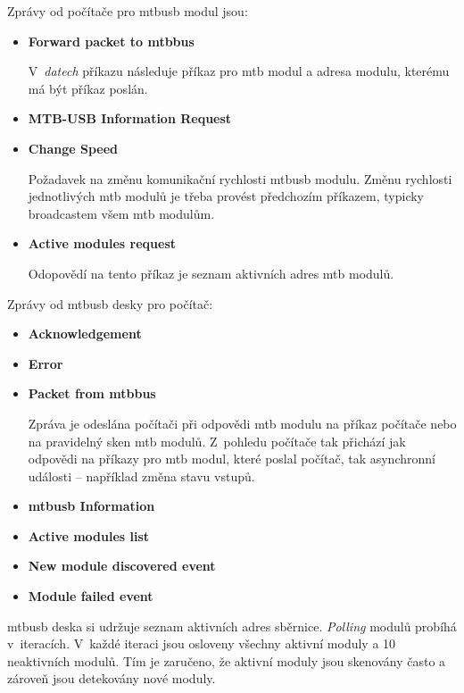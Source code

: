 Zprávy od počítače pro \gls{mtbusb} modul jsou:

\begin{itemize}
\item \textbf{Forward packet to \gls{mtbbus}}

V~\textit{datech} příkazu následuje příkaz pro \gls{mtb} modul a adresa modulu,
kterému má být příkaz poslán.

\item \textbf{MTB-USB Information Request}

\item \textbf{Change Speed}

Požadavek na změnu komunikační rychlosti \gls{mtbusb} modulu. Změnu rychlosti
jednotlivých \gls{mtb} modulů je třeba provést předchozím příkazem, typicky
broadcastem všem \gls{mtb} modulům.

\item \textbf{Active modules request}

Odopovědí na tento příkaz je seznam aktivních adres \gls{mtb} modulů.
\end{itemize}

Zprávy od \gls{mtbusb} desky pro počítač:

\begin{itemize}
\item \textbf{Acknowledgement}
\item \textbf{Error}
\item \textbf{Packet from \gls{mtbbus}}

Zpráva je odeslána počítači při odpovědi \gls{mtb} modulu na příkaz počítače
nebo na pravidelný sken \gls{mtb} modulů. Z~pohledu počítače tak přichází jak
odpovědi na příkazy pro \gls{mtb} modul, které poslal počítač, tak asynchronní
události – například změna stavu vstupů.

\item \textbf{\gls{mtbusb} Information}

\item \textbf{Active modules list}

\item \textbf{New module discovered event}

\item \textbf{Module failed event}

\end{itemize}

\gls{mtbusb} deska si udržuje seznam aktivních adres sběrnice. \textit{Polling}
modulů probíhá v~iteracích. V~každé iteraci jsou osloveny všechny aktivní
moduly a 10 neaktivních modulů. Tím je zaručeno, že aktivní moduly jsou
skenovány často a zároveň jsou detekovány nové moduly.


